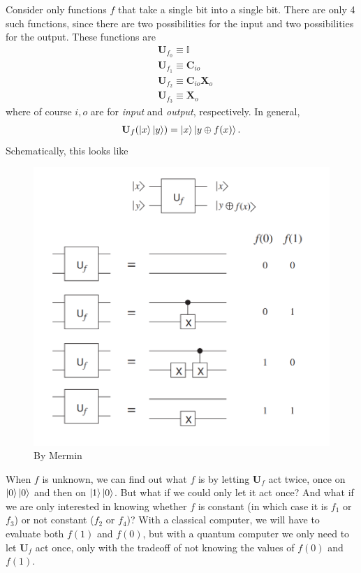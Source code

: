 \documentclass{book}
\theoremstyle{definition}
\newcommand{\X}{\mathbf{X}}
\newcommand{\Id}{\mathbb{I}}
\begin{document}
Consider only functions $f$ that take a single bit into a single bit. There are only 4 such functions, since there are two possibilities for the input and two possibilities for the output. These functions are
\begin{align}
&\mathbf{U}_{f_0} \equiv \Id\\
&\mathbf{U}_{f_1} \equiv \mathbf{C}_{io}\\
&\mathbf{U}_{f_2} \equiv \mathbf{C}_{io}\X_o\\
&\mathbf{U}_{f_3} \equiv \X_o
\end{align}
where of course $i,o$ are for \textit{input} and \textit{output}, respectively. In general,
\begin{align}
\mathbf{U}_f(\ket{x}\ket{y}) = \ket{x}\ket{y\oplus f(x)}.
\end{align}
Schematically, this looks like
\begin{figure}[!htb]
	\centering
	\includegraphics[scale=0.5]{U}
	\caption{By Mermin}
\end{figure}
When $f$ is unknown, we can find out what $f$ is by letting $\mathbf{U}_f$ act twice, once on $\ket{0}\ket{0}$ and then on $\ket{1}\ket{0}$. But what if we could only let it act once? And what if we are only interested in knowing whether $f$ is constant (in which case it is $f_1$ or $f_3$) or not constant ($f_2$ or $f_4$)? With a classical computer, we will have to evaluate both $f(1)$ and $f(0)$, but with a quantum computer we only need to let $\mathbf{U}_f$ act once, only with the tradeoff of not knowing the values of $f(0)$ and $f(1)$.  \\
\end{document}
